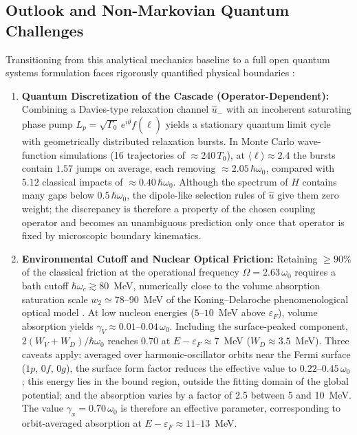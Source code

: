\documentclass[aps,prc,twocolumn,superscriptaddress,amsmath,amssymb,nofootinbib]{revtex4-2}
\begin{document}
\subsection{Outlook and Non-Markovian Quantum Challenges}
Transitioning from this analytical mechanics baseline to a full open quantum systems formulation faces rigorously quantified physical boundaries \cite{Breuer2002}:
\begin{enumerate}
    \item \textbf{Quantum Discretization of the Cascade (Operator-Dependent):} Combining a Davies-type relaxation channel \(\hat{u}_-\) with an incoherent saturating phase pump \(L_p = \sqrt{\Gamma_0}\,e^{i\theta}f(\hat{\ell})\) yields a stationary quantum limit cycle with geometrically distributed relaxation bursts. In Monte Carlo wave-function simulations (16 trajectories of \(\approx 240\,T_0\)), at \(\langle\ell\rangle \approx 2.4\) the bursts contain $1.57$ jumps on average, each removing \(\approx 2.05\,\hbar\omega_0\), compared with $5.12$ classical impacts of \(\approx 0.40\,\hbar\omega_0\). Although the spectrum of \(H\) contains many gaps below \(0.5\,\hbar\omega_0\), the dipole-like selection rules of \(\hat{u}\) give them zero weight; the discrepancy is therefore a property of the chosen coupling operator and becomes an unambiguous prediction only once that operator is fixed by microscopic boundary kinematics.
    \item \textbf{Environmental Cutoff and Nuclear Optical Friction:} Retaining \(\ge 90\%\) of the classical friction at the operational frequency \(\Omega = 2.63\,\omega_0\) requires a bath cutoff \(\hbar\omega_c \gtrsim 80\)~MeV, numerically close to the volume absorption saturation scale \(w_2 \simeq 78\text{--}90\)~MeV of the Koning--Delaroche phenomenological optical model \cite{Koning2003}. At low nucleon energies (\(5\text{--}10\)~MeV above \(\varepsilon_F\)), volume absorption yields \(\gamma_V \approx 0.01\text{--}0.04\,\omega_0\). Including the surface-peaked component, \(2(W_V+W_D)/\hbar\omega_0\) reaches \(0.70\) at \(E-\varepsilon_F \approx 7\)~MeV (\(W_D \approx 3.5\)~MeV). Three caveats apply: averaged over harmonic-oscillator orbits near the Fermi surface (\(1p\), \(0f\), \(0g\)), the surface form factor reduces the effective value to \(0.22\text{--}0.45\,\omega_0\); this energy lies in the bound region, outside the fitting domain of the global potential; and the absorption varies by a factor of 2.5 between 5 and 10~MeV. The value \(\gamma_x = 0.70\,\omega_0\) is therefore an effective parameter, corresponding to orbit-averaged absorption at \(E-\varepsilon_F \approx 11\text{--}13\)~MeV.

\end{enumerate}
\end{document}
